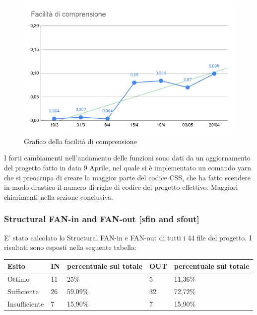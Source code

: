     \begin{figure}[H]
        \centering
        \includegraphics[width=10 cm]{source/sections/images/Facilita_comprensione.png}
        \caption{Grafico della facilità di comprensione}
    \end{figure}

    I forti cambiamenti nell'andamento delle funzioni sono dati da un aggiornamento del progetto fatto in data
    9 Aprile, nel quale si è implementato un comando yarn che si preoccupa di creare la maggior parte del
    codice CSS, che ha fatto scendere in modo drastico il numero di righe di codice del progetto effettivo. Maggiori chiarimenti nella sezione conclusiva.
\newpage
\subsubsection{Structural FAN-in and FAN-out  [sfin and sfout]}
    E' stato calcolato lo Structural FAN-in e FAN-out di tutti i 44 file del progetto. I risultati sono esposti nella seguente tabella:

    \begin{longtabu} to \textwidth {| X[0.1,c m] | X[0.1,c m] | X[0.1,c m] | X[0.1,c m] | X[0.1,c m] |}
        \hline
        \textbf{Esito} &
        \textbf{IN} &
        \textbf{percentuale sul totale} &
        \textbf{OUT} &
        \textbf{percentuale sul totale} \\
        \hline
        Ottimo & 11 & 25\% & 5 & 11,36\% \\ 
        \hline
        Sufficiente & 26 & 59,09\% & 32 & 72,72\% \\ 
        \hline
        Insufficiente & 7 & 15,90\% & 7 & 15,90\% \\ 
        \hline

        \end{longtabu}

